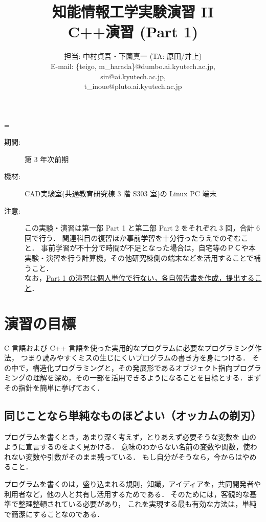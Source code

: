 \documentclass[11pt,a4,epsf]{jarticle}
\title{{\normalsize 知能情報工学実験演習 II } \\
\bf C++演習 (Part 1)}
\author{担当: 中村貞吾・下薗真一 (TA: 原田/井上)  \\
E-mail: \footnotesize
{\sf \{teigo, m\_harada\}@dumbo.ai.kyutech.ac.jp},\\
\footnotesize
{\sf sin@ai.kyutech.ac.jp},\\
\footnotesize
{\sf t\_inoue@pluto.ai.kyutech.ac.jp}}%
\date{}
\def\linesparpage#1{\baselineskip=\textheight\divide\baselineskip#1}
\begin{document}
\linesparpage{36}
\maketitle

\medskip

\begin{description}
\item[期間:] 第 3 年次前期
\item[機材:] CAD実験室(共通教育研究棟 3 階 S303 室)の Linux PC 端末%
\item[注意:] この実験・演習は第一部 Part 1 と第二部 Part 2 をそれぞれ 3 回，合計 6 回で行う．
関連科目の復習ほか事前学習を十分行ったうえでのぞむこと．
事前学習が不十分で時間が不足となった場合は，自宅等のＰＣや本実験・演習を行う計算機，その他研究棟側の端末などを活用することで補うこと．\\
なお，\underline{Part 1 の演習は個人単位で行ない，各自報告書を作成，提出すること}．
\end{description}

\medskip

\section{演習の目標}

C 言語および C++ 言語を使った実用的なプログラムに必要なプログラミング作法，
つまり読みやすくミスの生じにくいプログラムの書き方を身につける．
その中で，構造化プログラミングと，その発展形であるオブジェクト指向プログラミングの理解を深め，その一部を活用できるようになることを目標とする．まずその指針を簡単に挙げておく．

\subsection{同じことなら単純なものほどよい（オッカムの剃刃）}

プログラムを書くとき，あまり深く考えず，とりあえず必要そうな変数を
山のように宣言するのをよく見かける．
意味のわからない名前の変数や関数，使われない変数や引数がそのまま残っている．
もし自分がそうなら，今からはやめること．

プログラムを書くのは，盛り込まれる規則，知識，アイディアを，共同開発者や利用者など，他の人と共有し活用するためである．
そのためには，客観的な基準で整理整頓されている必要があり，
これを実現する最も有効な方法は，単純で簡潔にすることなのである．
\end{document}
